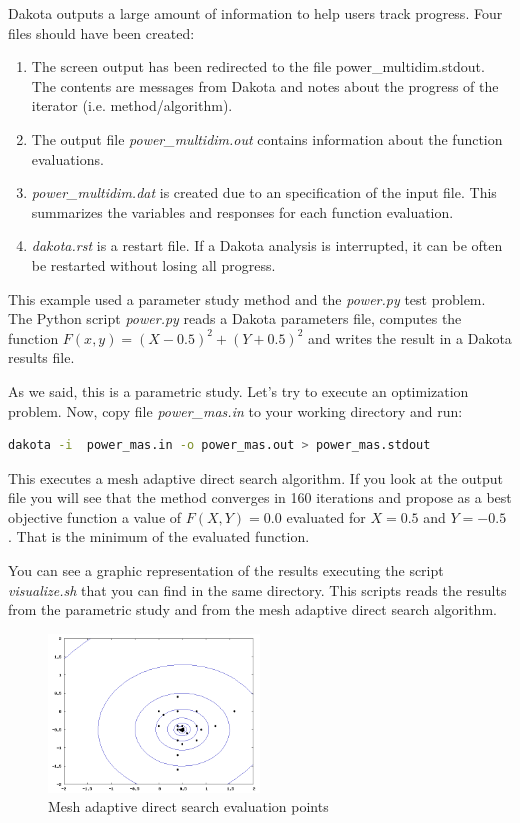 \documentclass[12pt,a4paper,article]{memoir}
\begin{document}
Dakota outputs a large amount of information to help users track progress. Four files should have been created:
\begin{enumerate}
\item The screen output has been redirected to the file power\_multidim.stdout. The contents are messages from Dakota and notes about the progress of the iterator (i.e. method/algorithm).
\item The output file \textit{power\_multidim.out} contains information about the function evaluations.
\item \textit{power\_multidim.dat} is created due to an specification of the input file. This summarizes the variables and responses for each function evaluation.
\item \textit{dakota.rst} is a restart file. If a Dakota analysis is interrupted, it can be often be restarted without losing all progress.
\end{enumerate}

This example used a parameter study method and the \textit{power.py} test problem. The Python script \textit{power.py} reads a Dakota parameters file, computes the function $F(x,y)=(X-0.5)^2+(Y+0.5)^2$ and writes the result in a Dakota results file.

As we said, this is a parametric study. Let's try to execute an optimization problem. Now, copy file \textit{power\_mas.in} to your working directory and run:

\begin{lstlisting}[style=MyCodeStyle,language=bash]
dakota -i  power_mas.in -o power_mas.out > power_mas.stdout
\end{lstlisting}

This executes a mesh adaptive direct search algorithm. If you look at the output file you will see that the method converges in 160 iterations and propose as a best objective function a value of $F(X,Y)=0.0$ evaluated for $X=0.5$ and $Y=-0.5$ . That is the minimum of the evaluated function.

You can see a graphic representation of the results executing the script \textit{visualize.sh} that you can find in the same directory. This scripts reads the results from the parametric study and from the mesh adaptive direct search algorithm.

\begin{figure}[htb!]
  \centering
    \includegraphics[width=0.5\textwidth]{power}
  \caption{Mesh adaptive direct search evaluation points}
  \label{fig:Power}
\end{figure}
\end{document}
